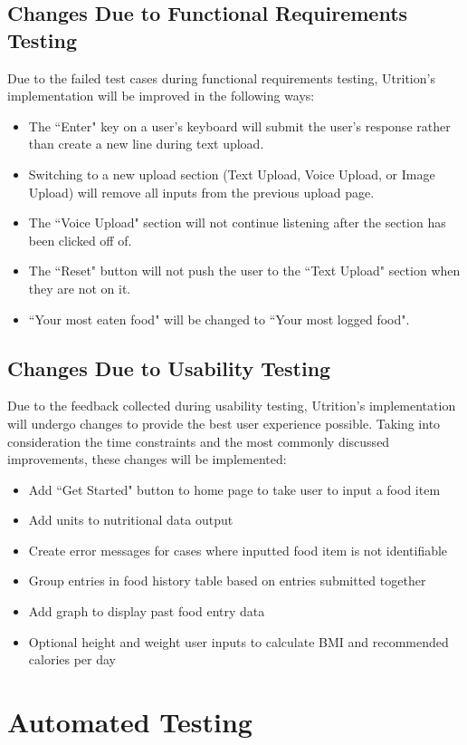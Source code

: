 \documentclass[12pt, titlepage]{article}
\begin{document}
	\subsection{Changes Due to Functional Requirements Testing}
	Due to the failed test cases during functional requirements testing, Utrition's implementation will be improved in the following ways:
	\begin{itemize}
		\item The ``Enter" key on a user's keyboard will submit the user's response rather than create a new line during text upload.
		\item Switching to a new upload section (Text Upload, Voice Upload, or Image Upload) will remove all inputs from the previous upload page. 
		\item The ``Voice Upload" section will not continue listening after the section has been clicked off of.
		\item The ``Reset" button will not push the user to the ``Text Upload" section when they are not on it.
		\item ``Your most eaten food" will be changed to ``Your most logged food".
	\end{itemize}

	\subsection{Changes Due to Usability Testing}
	Due to the feedback collected during usability testing, Utrition's implementation will undergo changes to provide the best user experience possible. Taking into consideration the time constraints and the most commonly discussed improvements, these changes will be implemented:
	\begin{itemize}
		\item Add ``Get Started" button to home page to take user to input a food item
		\item Add units to nutritional data output
		\item Create error messages for cases where inputted food item is not identifiable 
		\item Group entries in food history table based on entries submitted together
		\item Add graph to display past food entry data
		\item Optional height and weight user inputs to calculate BMI and recommended calories per day 
	\end{itemize}		

	\section{Automated Testing}
\end{document}
